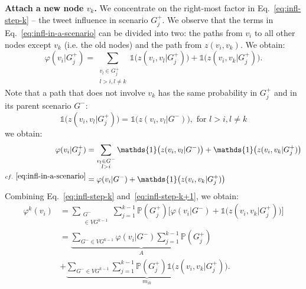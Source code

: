 \textbf{Attach a new node $v_k$.}
We concentrate on the right-most factor in Eq.~\eqref{eq:infl-step-k} -- the tweet influence in scenario $G^+_j$.
We observe that the terms in Eq.~\eqref{eq:infl-in-a-scenario} can be divided into two:
the paths from $v_i$ to all other nodes except $v_k$ (i.e. the old nodes) and the path from $z(v_i, v_k)$.
We obtain:
%
%
\begin{equation*}
	\varphi(v_i|G_j^+) = \sum_{\substack{v_l\in{G_j^+}\\l>i, l\neq k}} \mathds{1}\big(z(v_i,v_l|G_j^+)\big) + \mathds{1}\big(z(v_i,v_k|G_j^+)\big).
\end{equation*}
Note that a path that does not involve $v_k$ has the same probability in $G_j^+$ and in its parent scenario $G^-$:
\begin{equation*}
	\mathds{1}\big(z(v_i,v_l|G_j^+)\big) = \mathds{1}\big(z(v_i,v_l|G^-)\big), \text{ for } l > i, l \neq k
\end{equation*}
we obtain:
\begin{align}
				\varphi(v_i|G_j^+) 		&= \sum_{\substack{v_l\in{G^-}\\l>i}} \mathds{1}\big(z(v_i,v_l|G^-)\big) + \mathds{1}\big(z(v_i,v_k|G_j^+)\big) \nonumber \\
^{cf.~\eqref{eq:infl-in-a-scenario}}	&= \varphi(v_i | G^-) + \mathds{1}\big(z(v_i,v_k|G_j^+)\big) \label{eq:infl-step-k+1}
\end{align}
Combining Eq.~\eqref{eq:infl-step-k} and~\eqref{eq:infl-step-k+1}, we obtain:
\begin{align}
\varphi^k(v_i) &= \sum_{\substack{G^-\\\in VG^{k-1}}}\sum^{k-1}_{j=1} \mathds{P}(G_j^+) \bigg[ \varphi(v_i | G^-) + \mathds{1}\big(z(v_i,v_k|G_j^+)\big) \bigg] \nonumber \\
        &= \underbrace{\sum_{G^- \in {VG^{k-1}}} \varphi(v_i | G^-) \sum^{k-1}_{j=1}\mathds{P}(G_j^+) }_{A} \nonumber \\
        &+ \underbrace{\sum_{G^- \in {VG^{k-1}}}\sum^{k-1}_{j=1} \mathds{P}(G_j^+) \mathds{1}\big(z(v_i,v_k|G_j^+)\big) }_{m_{ik}}. \label{eq:two-parts}
\end{align}

